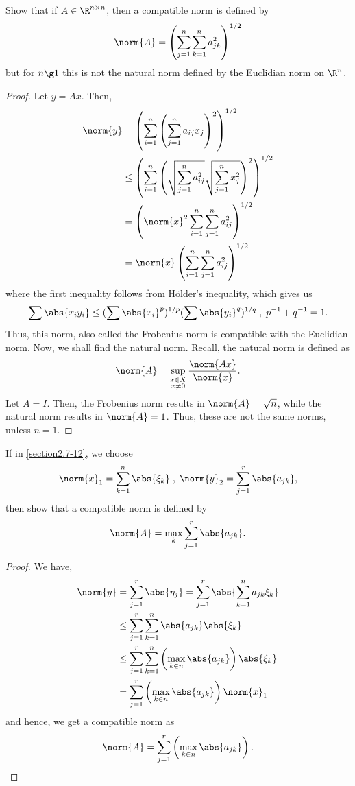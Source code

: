 \begin{question}
    Show that if $A \in \R^{n \times n}$, then a compatible norm is defined by
    \[\norm{A} = \left(\sum_{j=1}^n \sum_{k=1}^n a_{jk}^2 \right)^{1/2}\]
    but for $n \g 1$ this is not the natural norm defined by the Euclidian norm on $\R^n$.
    \label{section2.7-13}
\end{question}
\begin{proof}
    Let $y  =Ax$. Then, 
    \begin{align*}
        \norm{y} &= \left(\sum_{i=1}^n \left( \sum_{j=1}^n a_{ij}x_j \right)^2\right)^{1/2}
        \\
        &\leq \left(\sum_{i=1}^n \left( \sqrt{\sum_{j=1}^n a_{ij}^2} \sqrt{\sum_{j=1}^n x_j^2} \right)^2\right)^{1/2}
        \\
        &= \left(\norm{x}^2 \sum_{i=1}^n \sum_{j=1}^n a_{ij}^2 \right)^{1/2}
        \\
        &= \norm{x}\left( \sum_{i=1}^n \sum_{j=1}^n a_{ij}^2 \right)^{1/2}
    \end{align*}
    where the first inequality follows from Hölder's inequality, which gives us
    \[\sum \abs{x_i y_i} \leq (\sum \abs{x_i}^p)^{1/p} (\sum \abs{y_i}^q)^{1/q} \;,\; p^{-1} + q^{-1} = 1. \]
    Thus, this norm, also called the Frobenius norm is compatible with the Euclidian norm. Now, we shall find the natural norm. Recall, the natural norm is defined as
    \[\norm{A} = \sup_{\substack{x \in X \\ x \neq 0}} \frac{\norm{Ax}}{\norm{x}}.\]
    Let $A = I$. Then, the Frobenius norm results in $\norm{A} = \sqrt{n}$, while the natural norm results in $\norm{A} = 1$. Thus, these are not the same norms, unless $n = 1$.
\end{proof}

\begin{question}
    If in \ref{section2.7-12}, we choose
    \[\norm{x}_1 = \sum_{k=1}^n \abs{\xi_k} \;,\; \norm{y}_2 = \sum_{j=1}^r \abs{a_{jk}},\]
    then show that a compatible norm is defined by
    \[\norm{A} = \max_{k} \sum_{j=1}^r \abs{a_{jk}}.\]
    \label{section2.7-14}
\end{question}
\begin{proof}
    We have,
    \begin{align*}
        \norm{y} &= \sum_{j=1}^r \abs{\eta_j} = \sum_{j=1}^r \abs{\sum_{k=1}^n a_{jk}\xi_k}
        \\
        &\leq \sum_{j=1}^r \sum_{k=1}^n \abs{a_{jk}}\abs{\xi_k}
        \\
        &\leq \sum_{j=1}^r \sum_{k=1}^n \left(\max_{k \in n}\abs{a_{jk}}\right) \abs{\xi_k}
        \\
        &= \sum_{j=1}^r \left(\max_{k \in n}\abs{a_{jk}}\right) \norm{x}_1
        \\
    \end{align*}
    and hence, we get a compatible norm as 
    \[\norm{A} = \sum_{j=1}^r \left(\max_{k \in n}\abs{a_{jk}}\right).\]
\end{proof}

